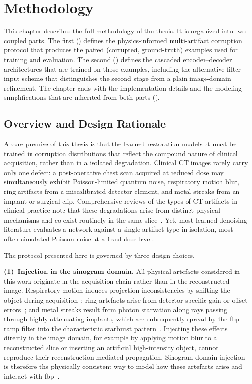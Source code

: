 \chapter{Methodology}
\label{chap:methodology}

This chapter describes the full methodology of the thesis. It is organized into two coupled parts. The first
() defines the physics-informed multi-artifact corruption protocol
that produces the paired (corrupted, ground-truth) examples used for training and evaluation. The second
() defines the cascaded encoder--decoder architectures that are trained on those examples, including the alternative-filter input scheme that distinguishes the second stage from a plain image-domain
refinement. The chapter ends with the implementation details and the modeling simplifications that are inherited from
both parts ().

\section{Overview and Design Rationale}
\label{sec:meth_overview}
\label{chap:corruption}%

A core premise of this thesis is that the learned restoration models \gls{ct} must be trained in corruption distributions that reflect the compound nature of clinical acquisition, rather than in a isolated degradation. Clinical CT images
rarely carry only one defect: a post-operative chest scan acquired at reduced dose may simultaneously exhibit
Poisson-limited quantum noise, respiratory motion blur, ring artifacts from a miscalibrated detector element, and metal
streaks from an implant or surgical clip. Comprehensive reviews of the types of CT artifacts in clinical practice note that these degradations arise from distinct physical mechanisms and co-exist routinely in the same
slice~\cite{Boas2012, Gjesteby2016}. Yet, most learned-denoising literature evaluates a network against a single artifact
type in isolation, most often simulated Poisson noise at a fixed dose level.

The protocol presented here is governed by three design choices.

\textbf{(1)~Injection in the sinogram domain.} All physical artefacts considered in this work originate in the acquisition chain rather than in the reconstructed image. Respiratory motion induces projection inconsistencies by shifting the object during acquisition~\cite{LuMackie2002, Mao2007}; ring artefacts arise from detector-specific gain or offset errors~\cite{Sijbers2004, Prell2009}; and metal streaks result from photon starvation along rays passing through highly attenuating implants, which are subsequently spread by the \gls{fbp} ramp filter into the characteristic starburst pattern~\cite{Gjesteby2016}. Injecting these effects directly in the image domain, for example by applying motion blur to a reconstructed slice or inserting an artificial high-intensity object, cannot reproduce their reconstruction-mediated propagation. Sinogram-domain injection is therefore the physically consistent way to model how these artefacts arise and interact with \gls{fbp}~\cite{Mao2007}.

